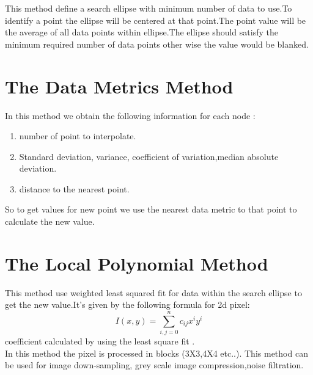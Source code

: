 \documentclass{article}
\begin{document}
\begin{multicols*}{2}
\begin{flushleft}
This method define a search ellipse with minimum number of data to use.To identify a point the ellipse will be centered at that point.The point value will be the average of all data points within ellipse.The ellipse should satisfy the minimum required number of data points other wise the value would be blanked.\cite{1}
\end{flushleft}
{\centering	\section{The Data Metrics Method}}
\begin{flushleft}
In this method we obtain the following information for each node : 
\begin{enumerate}
	\item number of point to interpolate.
	\item Standard deviation, variance, coefficient of variation,median absolute deviation.
	\item distance to the nearest point.
\end{enumerate}
So to get values for new point we use the nearest data metric to that point to calculate the new value.
\end{flushleft}
{\centering	\section{The Local Polynomial Method}}
\begin{flushleft}
This method use weighted least squared fit for data within the search ellipse to get the new value.It's given by the following formula for 2d pixel:
\[I(x,y)=\sum_{i,j=0}^{n}c_{ij}x^iy^i \] coefficient calculated by using the least square fit .\cite{8}\\ In this method the pixel is processed in blocks (3X3,4X4 etc..). This method can be used for image down-sampling, grey scale image compression,noise filtration.\cite{8}
\end{flushleft}
\begin{thebibliography}{9}
	

\end{thebibliography}
\end{multicols*}
\end{document}
